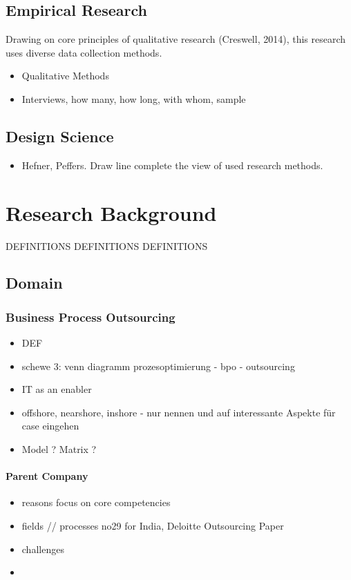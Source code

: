 	\section{Empirical Research}
Drawing on core principles of qualitative research (Creswell, 2014), this research uses diverse data collection methods. 
	
		\begin{itemize}
			\item Qualitative Methods
			\item Interviews, how many, how long, with whom, sample
			
		\end{itemize}
	\section{Design Science}
		\begin{itemize}
			\item Hefner, Peffers. Draw line complete the view of used research methods.
		\end{itemize}
\chapter{Research Background}
	DEFINITIONS DEFINITIONS DEFINITIONS
	\section{Domain}
		\subsection{Business Process Outsourcing}
		\begin{itemize}
			\item DEF
			\item schewe 3: venn diagramm prozesoptimierung - bpo - outsourcing
			\item IT as an enabler
			\item offshore, nearshore, inshore - nur nennen und auf interessante Aspekte für case eingehen
			\item Model ? Matrix ? 
		\end{itemize}
		\subsubsection{Parent Company}
		\begin{itemize}
			\item reasons focus on core competencies
			\item fields // processes no29 for India, Deloitte Outsourcing Paper
			\item challenges
			\item 
		\end{itemize}
